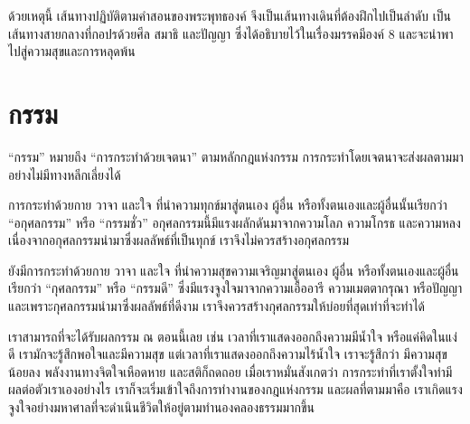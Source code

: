 \documentclass[12pt, openany]{book}
\begin{document}
ด้วย{\wbr}เหตุ{\wbr}นี้ เส้นทาง{\wbr}ปฏิบัติ{\wbr}ตาม{\wbr}คำ{\wbr}สอน{\wbr}ของ{\wbr}พระพุทธองค์ จึง{\wbr}เป็น{\wbr}เส้นทาง{\wbr}เดิน{\wbr}ที่{\wbr}ต้อง{\wbr}ฝึก{\wbr}ไป{\wbr}เป็น{\wbr}ลำดับ เป็น{\wbr}เส้นทาง{\wbr}สาย{\wbr}กลาง{\wbr}ที่{\wbr}กอปร{\wbr}ด้วย{\wbr}ศีล สมาธิ และ{\wbr}ปัญญา ซึ่ง{\wbr}ได้{\wbr}อธิบาย{\wbr}ไว้{\wbr}ใน{\wbr}เรื่อง{\wbr}มรรค{\wbr}มี{\wbr}องค์ 8 และ{\wbr}จะ{\wbr}นำพา{\wbr}ไป{\wbr}สู่{\wbr}ความ{\wbr}สุข{\wbr}และ{\wbr}การ{\wbr}หลุดพ้น{\wbr}

\section{กรรม}


“กรรม” หมาย{\wbr}ถึง “การ{\wbr}กระทำ{\wbr}ด้วย{\wbr}เจตนา”  ตาม{\wbr}หลัก{\wbr}กฎ{\wbr}แห่ง{\wbr}กรรม การ{\wbr}กระทำ{\wbr}โดย{\wbr}เจตนา{\wbr}จะ{\wbr}ส่ง{\wbr}ผล{\wbr}ตาม{\wbr}มา{\wbr}อย่าง{\wbr}ไม่{\wbr}มี{\wbr}ทาง{\wbr}หลีก{\wbr}เลี่ยง{\wbr}ได้  

การ{\wbr}กระทำ{\wbr}ด้วย{\wbr}กาย วาจา และ{\wbr}ใจ ที่{\wbr}นำ{\wbr}ความ{\wbr}ทุกข์{\wbr}มา{\wbr}สู่{\wbr}ตนเอง ผู้{\wbr}อื่น หรือ{\wbr}ทั้ง{\wbr}ตนเอง{\wbr}และ{\wbr}ผู้{\wbr}อื่น{\wbr}นั้น{\wbr}เรียก{\wbr}ว่า “อกุศล{\wbr}กรรม” หรือ “กรรม{\wbr}ชั่ว”  อกุศล{\wbr}กรรม{\wbr}นี้{\wbr}มี{\wbr}แรงผลัก{\wbr}ดัน{\wbr}มา{\wbr}จาก{\wbr}ความ{\wbr}โลภ ความ{\wbr}โกรธ และ{\wbr}ความ{\wbr}หลง  เนื่อง{\wbr}จาก{\wbr}อกุศล{\wbr}กรรม{\wbr}นำ{\wbr}มา{\wbr}ซึ่ง{\wbr}ผลลัพธ์{\wbr}ที่{\wbr}เป็น{\wbr}ทุกข์ เรา{\wbr}จึง{\wbr}ไม่{\wbr}ควร{\wbr}สร้าง{\wbr}อกุศล{\wbr}กรรม{\wbr}

ยัง{\wbr}มี{\wbr}การ{\wbr}กระทำ{\wbr}ด้วย{\wbr}กาย วาจา และ{\wbr}ใจ ที่{\wbr}นำ{\wbr}ความ{\wbr}สุข{\wbr}ความ{\wbr}เจริญ{\wbr}มา{\wbr}สู่{\wbr}ตนเอง ผู้{\wbr}อื่น หรือ{\wbr}ทั้ง{\wbr}ตนเอง{\wbr}และ{\wbr}ผู้{\wbr}อื่น เรียก{\wbr}ว่า “กุศล{\wbr}กรรม” หรือ “กรรม{\wbr}ดี”  ซึ่ง{\wbr}มี{\wbr}แรง{\wbr}จูง{\wbr}ใจ{\wbr}มา{\wbr}จาก{\wbr}ความ{\wbr}เอื้อ{\wbr}อารี ความ{\wbr}เมตตา{\wbr}กรุณา หรือ{\wbr}ปัญญา และ{\wbr}เพราะ{\wbr}กุศล{\wbr}กรรม{\wbr}นำ{\wbr}มา{\wbr}ซึ่ง{\wbr}ผลลัพธ์{\wbr}ที่{\wbr}ดี{\wbr}งาม เรา{\wbr}จึง{\wbr}ควร{\wbr}สร้าง{\wbr}กุศล{\wbr}กรรม{\wbr}ให้{\wbr}บ่อย{\wbr}ที่สุด{\wbr}เท่า{\wbr}ที่{\wbr}จะ{\wbr}ทำ{\wbr}ได้{\wbr}

เรา{\wbr}สามารถ{\wbr}ที่{\wbr}จะ{\wbr}ได้{\wbr}รับ{\wbr}ผล{\wbr}กรรม ณ ตอน{\wbr}นี้{\wbr}เลย เช่น เวลา{\wbr}ที่{\wbr}เรา{\wbr}แสดงออก{\wbr}ถึง{\wbr}ความ{\wbr}มี{\wbr}น้ำใจ หรือ{\wbr}แค่{\wbr}คิด{\wbr}ใน{\wbr}แง่{\wbr}ดี เรา{\wbr}มัก{\wbr}จะ{\wbr}รู้สึก{\wbr}พอใจ{\wbr}และ{\wbr}มี{\wbr}ความ{\wbr}สุข แต่{\wbr}เวลา{\wbr}ที่{\wbr}เรา{\wbr}แสดงออก{\wbr}ถึง{\wbr}ความ{\wbr}ไร้{\wbr}น้ำใจ เรา{\wbr}จะ{\wbr}รู้สึก{\wbr}ว่า มี{\wbr}ความ{\wbr}สุข{\wbr}น้อย{\wbr}ลง พลังงาน{\wbr}ทาง{\wbr}จิตใจ{\wbr}เหือดหาย และ{\wbr}สติ{\wbr}ก็{\wbr}ถดถอย  เมื่อ{\wbr}เรา{\wbr}หมั่น{\wbr}สังเกต{\wbr}ว่า การ{\wbr}กระทำ{\wbr}ที่{\wbr}เรา{\wbr}ตั้งใจ{\wbr}ทำ{\wbr}มี{\wbr}ผล{\wbr}ต่อ{\wbr}ตัว{\wbr}เรา{\wbr}เอง{\wbr}อย่างไร เรา{\wbr}ก็{\wbr}จะ{\wbr}เริ่ม{\wbr}เข้าใจ{\wbr}ถึง{\wbr}การ{\wbr}ทำงาน{\wbr}ของ{\wbr}กฎ{\wbr}แห่ง{\wbr}กรรม และ{\wbr}ผล{\wbr}ที่{\wbr}ตาม{\wbr}มา{\wbr}คือ เรา{\wbr}เกิด{\wbr}แรง{\wbr}จูง{\wbr}ใจ{\wbr}อย่าง{\wbr}มหาศาล{\wbr}ที่{\wbr}จะ{\wbr}ดำเนิน{\wbr}ชีวิต{\wbr}ให้{\wbr}อยู่{\wbr}ตาม{\wbr}ทำนอง{\wbr}คลอง{\wbr}ธรรม{\wbr}มาก{\wbr}ขึ้น{\wbr}
\end{document}
